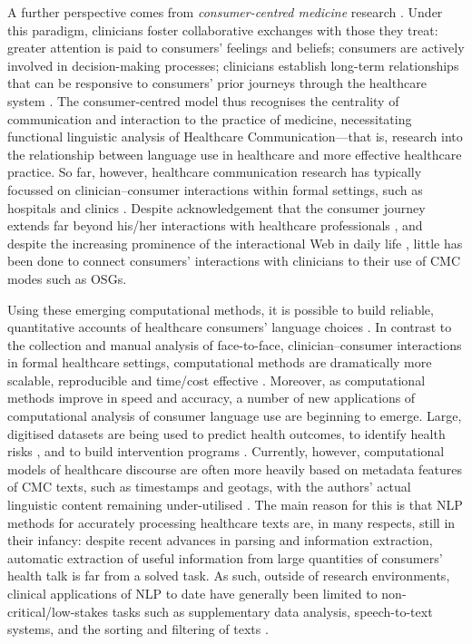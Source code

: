 \documentclass{article}
\renewcommand{\cite}{\parencite}
\begin{document}
A further perspective comes from \emph{consumer-centred medicine} research \cite{stewart_effective_1995}. Under this paradigm, clinicians foster collaborative exchanges with those they treat: greater attention is paid to consumers' feelings and beliefs; consumers are actively involved in decision-making processes; clinicians establish long-term relationships that can be responsive to consumers' prior journeys through the healthcare system \cite{woodward-kron_international_2016}. The consumer-centred model thus recognises the centrality of communication and interaction to the practice of medicine, necessitating functional linguistic analysis of Healthcare Communication---that is, research into the relationship between language use in healthcare and more effective healthcare practice. So far, however, healthcare communication research has typically focussed on clinician--consumer interactions within formal settings, such as hospitals and clinics \cite{slade_communicating_2015}. Despite acknowledgement that the consumer journey extends far beyond his\slash her interactions with healthcare professionals \cite{balka_situating_2010,dickerson_cancer_2011}, and despite the increasing prominence of the interactional Web in daily life \cite{hadlington_cognitive_2015}, little has been done to connect consumers' interactions with clinicians to their use of CMC modes such as OSGs.


Using these emerging computational methods, it is possible to build reliable, quantitative accounts of healthcare consumers' language choices \cite[see][for a recent example]{maclean_forum77:_2015}. In contrast to the collection and manual analysis of face-to-face, clinician--consumer interactions in formal healthcare settings, computational methods are dramatically more scalable, reproducible and time\slash cost effective \cite{yao_impact_2015}. Moreover, as computational methods improve in speed and accuracy, a number of new applications of computational analysis of consumer language use are beginning to emerge. Large, digitised datasets are being used to predict health outcomes, to identify health risks \cite{kim_use_2013,st_louis_can_2012,oleary_twitter_2015}, and to build intervention programs \cite{chen_dissecting_2015}. Currently, however, computational models of healthcare discourse are often more heavily based on metadata features of CMC texts, such as timestamps and geotags, with the authors' actual linguistic content remaining under-utilised \cite{yesha_method_2015}. The main reason for this is that NLP methods for accurately processing healthcare texts are, in many respects, still in their infancy: despite recent advances in parsing and information extraction, automatic extraction of useful information from large quantities of consumers' health talk is far from a solved task. As such, outside of research environments, clinical applications of NLP to date have generally been limited to non-critical\slash low-stakes tasks such as supplementary data analysis, speech-to-text systems, and the sorting and filtering of texts \cite{maddox_natural_2015,wasfy_enhancing_2015}.
\end{document}
